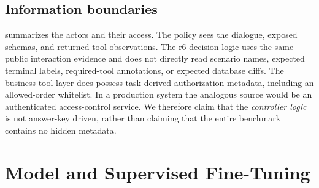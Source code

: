 \documentclass[11pt]{article}
\begin{document}
\subsection{Information boundaries}

 summarizes the actors and their access. The policy sees the dialogue, exposed schemas, and returned tool observations. The r6 decision logic uses the same public interaction evidence and does not directly read scenario names, expected terminal labels, required-tool annotations, or expected database diffs. The business-tool layer does possess task-derived authorization metadata, including an allowed-order whitelist. In a production system the analogous source would be an authenticated access-control service. We therefore claim that the \emph{controller logic} is not answer-key driven, rather than claiming that the entire benchmark contains no hidden metadata.

\begin{table}[t]
\centering
\caption{Components and information boundaries. ``Gold'' denotes scenario labels or expected answers.}
\label{tab:components}
\scriptsize
{}
\end{table}

\section{Model and Supervised Fine-Tuning}
\label{sec:sft}
\end{document}
